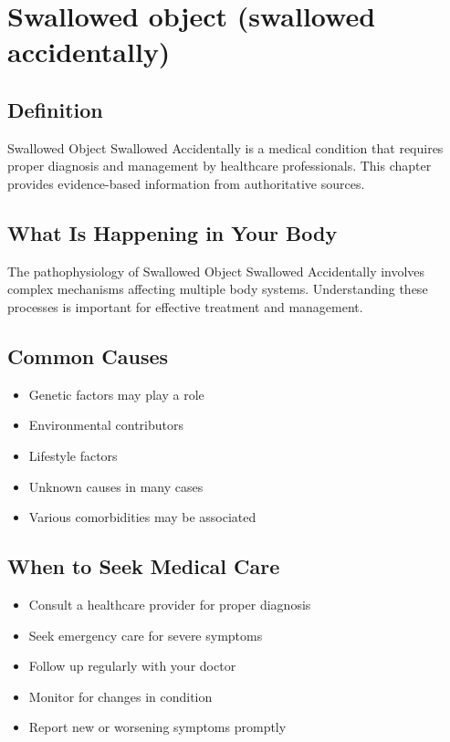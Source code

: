 
\chapter{Swallowed object (swallowed accidentally)}

\section*{Definition}
Swallowed Object Swallowed Accidentally is a medical condition that requires proper diagnosis and management by healthcare professionals. This chapter provides evidence-based information from authoritative sources.

\section*{What Is Happening in Your Body}
The pathophysiology of Swallowed Object Swallowed Accidentally involves complex mechanisms affecting multiple body systems. Understanding these processes is important for effective treatment and management.

\section*{Common Causes}
\begin{itemize}
  \item Genetic factors may play a role
  \item Environmental contributors
  \item Lifestyle factors
  \item Unknown causes in many cases
  \item Various comorbidities may be associated
\end{itemize}

\section*{When to Seek Medical Care}
\begin{itemize}
  \item Consult a healthcare provider for proper diagnosis
  \item Seek emergency care for severe symptoms
  \item Follow up regularly with your doctor
  \item Monitor for changes in condition
  \item Report new or worsening symptoms promptly
\end{itemize}

